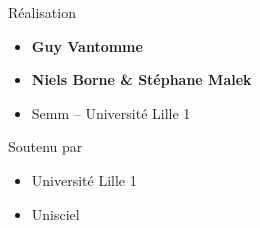 \begin{frame}
\begin{minipage}{0.50\textwidth}
  \medskip

  Réalisation
  \begin{itemize}
    \item {\bf Guy Vantomme}
    \item {\bf \small Niels Borne  \& Stéphane Malek}     
    \item Semm -- Université Lille 1
  \end{itemize}

  \medskip

  Soutenu par 
  \begin{itemize}
    \item Université Lille 1
    \item Unisciel
  \end{itemize}

  \end{minipage}  



\end{frame}


